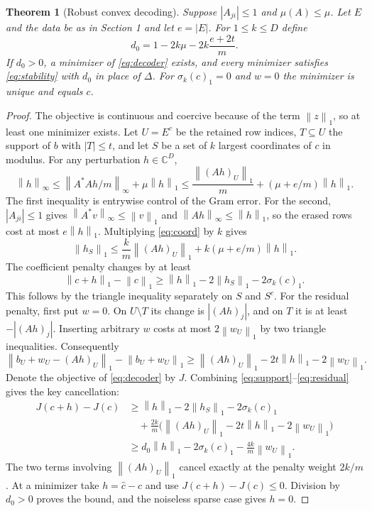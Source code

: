\documentclass[11pt]{article}
\newtheorem{theorem}{Theorem}[section]
\theoremstyle{remark}\newtheorem{remark}[theorem]{Remark}
\newcommand{\C}{\mathbb C}
\newcommand{\norm}[1]{\left\lVert#1\right\rVert}
\newcommand{\abs}[1]{\left|#1\right|}
\begin{document}
\begin{theorem}[Robust convex decoding]\label{thm:convex}
Suppose $\abs{A_{ji}}\le1$ and $\mu(A)\le\mu$. Let $E$ and the data be as in Section 1 and let $e=\abs E$. For $1\le k\le D$ define
\[
 d_0=1-2k\mu-2k\frac{e+2t}{m}.
\]
If $d_0>0$, a minimizer of \eqref{eq:decoder} exists, and every minimizer satisfies \eqref{eq:stability} with $d_0$ in place of $\Delta$. For $\sigma_k(c)_1=0$ and $w=0$ the minimizer is unique and equals $c$.
\end{theorem}
\begin{proof}
The objective is continuous and coercive because of the term $\norm{z}_1$, so at least one minimizer exists. Let $U=E^c$ be the retained row indices, $T\subseteq U$ the support of $b$ with $\abs T\le t$, and let $S$ be a set of $k$ largest coordinates of $c$ in modulus. For any perturbation $h\in\C^D$,
\begin{equation}\label{eq:coord}
 \norm h_\infty
 \le \norm{A^*Ah/m}_\infty+\mu\norm h_1
 \le \frac{\norm{(Ah)_U}_1}{m}+(\mu+e/m)\norm h_1.
\end{equation}
The first inequality is entrywise control of the Gram error. For the second, $\abs{A_{ji}}\le1$ gives $\norm{A^*v}_\infty\le\norm v_1$ and $\norm{Ah}_\infty\le\norm h_1$, so the erased rows cost at most $e\norm h_1$. Multiplying \eqref{eq:coord} by $k$ gives
\begin{equation}\label{eq:support}
 \norm{h_S}_1\le \frac{k}{m}\norm{(Ah)_U}_1+k(\mu+e/m)\norm h_1.
\end{equation}
The coefficient penalty changes by at least
\begin{equation}\label{eq:coeff}
 \norm{c+h}_1-\norm c_1\ge\norm h_1-2\norm{h_S}_1-2\sigma_k(c)_1.
\end{equation}
This follows by the triangle inequality separately on $S$ and $S^c$. For the residual penalty, first put $w=0$. On $U\setminus T$ its change is $\abs{(Ah)_j}$, and on $T$ it is at least $-\abs{(Ah)_j}$. Inserting arbitrary $w$ costs at most $2\norm{w_U}_1$ by two triangle inequalities. Consequently
\begin{equation}\label{eq:residual}
 \norm{b_U+w_U-(Ah)_U}_1-\norm{b_U+w_U}_1
 \ge \norm{(Ah)_U}_1-2t\norm h_1-2\norm{w_U}_1.
\end{equation}
Denote the objective of \eqref{eq:decoder} by $J$. Combining \eqref{eq:support}--\eqref{eq:residual} gives the key cancellation:
\begin{align*}
 J(c+h)-J(c)
 &\ge \norm h_1-2\norm{h_S}_1-2\sigma_k(c)_1\\
 &\quad+\frac{2k}{m}\bigl(\norm{(Ah)_U}_1-2t\norm h_1-2\norm{w_U}_1\bigr)\\
 &\ge d_0\norm h_1-2\sigma_k(c)_1-\frac{4k}{m}\norm{w_U}_1.
\end{align*}
The two terms involving $\norm{(Ah)_U}_1$ cancel exactly at the penalty weight $2k/m$. At a minimizer take $h=\widehat c-c$ and use $J(c+h)-J(c)\le0$. Division by $d_0>0$ proves the bound, and the noiseless sparse case gives $h=0$.
\end{proof}
\end{document}
